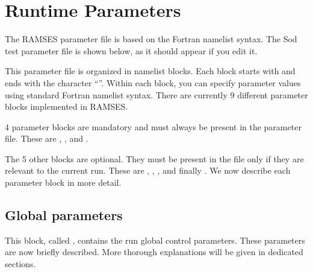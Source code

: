\clearpage
\section{Runtime Parameters}

The RAMSES parameter file is based on the Fortran namelist syntax. The
Sod test parameter file is shown below, as it should appear if you edit
it.

\logfile{\fullnmlfilename}

This parameter file is organized in namelist blocks. Each block starts
with  and ends with the character ``\cmd{/}''. Within
each block, you can specify parameter values using standard Fortran
namelist syntax. There are currently 9 different parameter blocks
implemented in RAMSES.

\begin{warning}
4 parameter blocks are mandatory and must always be present in the
parameter file. These are ,
,  and
.
\end{warning}

The 5 other blocks are optional. They must be present in the file only
if they are relevant to the current run. These are
, ,
,  and finally
. We now describe each parameter block in
more detail.

\clearpage
\subsection{Global parameters}

This block, called , contains the run global
control parameters. These parameters are now briefly described. More
thorough explanations will be given in dedicated sections.


